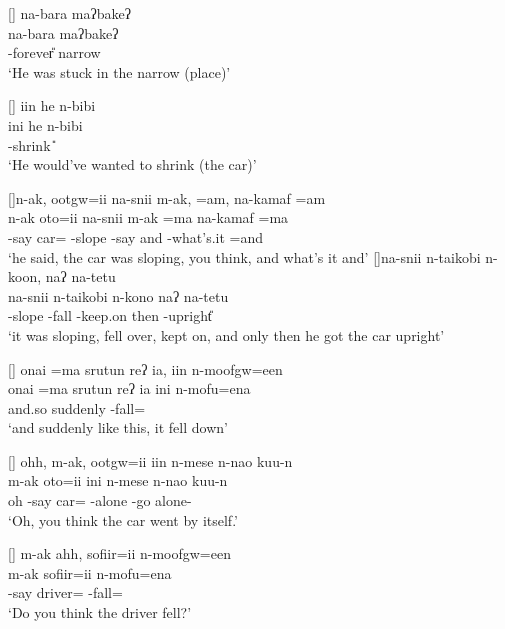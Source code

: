 \begin{exe}
[]{\glll
	na-bara maʔbakeʔ \\
	na-bara maʔbakeʔ \\
	\na-forever{\U} narrow \\
\glt `He was stuck in the narrow (place)' }

\vspace{-4pt}
[]{\glll
	iin he n-bibi \\
	ini he n-bibi \\
	{\iin} {\he} \n-shrink {\U} \\
\glt `He would've wanted to shrink (the car)'}

[]{\glll	n-ak, ootgw=ii na-snii m-ak, =am, na-kamaf =am\\
										n-ak oto=ii na-snii m-ak =ma na-kamaf =ma\\
										\n-say car={\ii} \na-slope \m-say and \na-what's.it =and\\
							\glt	`he said, the car was sloping, you think, and what's it and'}
[]{\glll	na-snii n-taikobi n-koon, naʔ na-tetu\-snii n-taikobi n-kono naʔ na-tetu\\
										\na-slope \n-fall \n-keep.on then \nat-upright{\U}\\
							\glt	`it was sloping, fell over, kept on, and only then he got the car upright' }

[]{\glll
	{onai =ma} srutun reʔ ia, iin n-moofgw=een \\
	{onai =ma} srutun reʔ ia ini n-mofu=ena \\
	and.so suddenly {\req} {\ia} {\iin} \n-fall={\een} \\
\glt `and suddenly like this, it fell down'}

\vspace{-4pt}
[]{\glll
	ohh, m-ak, ootgw=ii iin n-mese n-nao kuu-n \\
	{} m-ak oto=ii ini n-mese n-nao kuu-n \\
	oh \m-say car={\ii} {\iin} \n-alone \n-go alone-{\N} \\
\glt `Oh, you think the car went by itself.'}

[]{\glll
	m-ak ahh, sofiir=ii n-moofgw=een\\
	m-ak {} sofiir=ii n-mofu=ena\\
	\m-say {} driver={\ii} \n-fall={\een} \\
\glt `Do you think the driver fell?' }


\end{exe}
